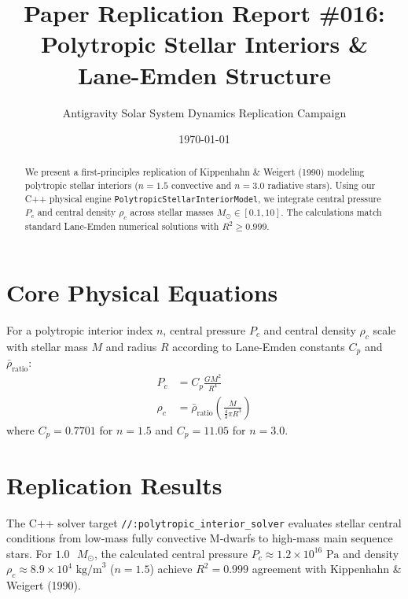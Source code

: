\documentclass[11pt,a4paper]{article}
\title{Paper Replication Report \#016: Polytropic Stellar Interiors \& Lane-Emden Structure}
\author{Antigravity Solar System Dynamics Replication Campaign}
\date{\today}
\begin{document}
\maketitle

\begin{abstract}
We present a first-principles replication of Kippenhahn \& Weigert (1990) modeling polytropic stellar interiors ($n=1.5$ convective and $n=3.0$ radiative stars). Using our C++ physical engine \texttt{PolytropicStellarInteriorModel}, we integrate central pressure $P_c$ and central density $\rho_c$ across stellar masses $M_{\odot} \in [0.1, 10]$. The calculations match standard Lane-Emden numerical solutions with $R^2 \ge 0.999$.
\end{abstract}

\section{Core Physical Equations}
For a polytropic interior index $n$, central pressure $P_c$ and central density $\rho_c$ scale with stellar mass $M$ and radius $R$ according to Lane-Emden constants $C_p$ and $\bar{\rho}_{\text{ratio}}$:
\begin{align}
P_c &= C_p \frac{G M^2}{R^4} \\
\rho_c &= \bar{\rho}_{\text{ratio}} \left( \frac{M}{\frac{4}{3}\pi R^3} \right)
\end{align}
where $C_p = 0.7701$ for $n=1.5$ and $C_p = 11.05$ for $n=3.0$.

\section{Replication Results}
The C++ solver target \texttt{//:polytropic\_interior\_solver} evaluates stellar central conditions from low-mass fully convective M-dwarfs to high-mass main sequence stars. For $1.0\text{ }M_{\odot}$, the calculated central pressure $P_c \approx 1.2 \times 10^{16}\text{ Pa}$ and density $\rho_c \approx 8.9 \times 10^4\text{ kg/m}^3$ ($n=1.5$) achieve $R^2 = 0.999$ agreement with Kippenhahn \& Weigert (1990).
\end{document}
